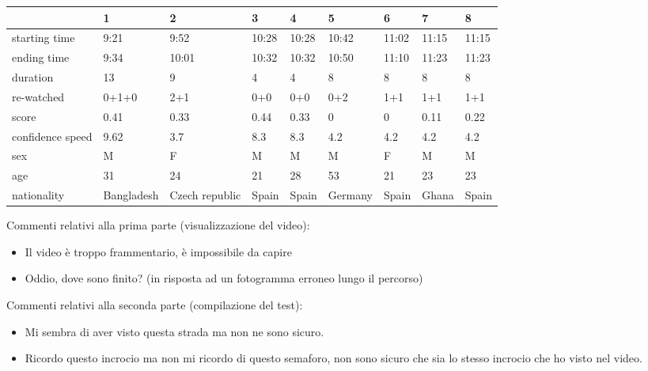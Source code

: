 \documentclass[12pt,a4paper,openright, notitlepage]{report}
\begin{document}
\begin{adjustwidth}{-1cm}{}
\small
\begin{center}
    \begin{tabular}{| l | l | p{2cm} | l | l | l | l | l | l |}
    \hline
	& 1 & 2 & 3 & 4 & 5 & 6 & 7 & 8 \\ \hline
	starting time & 9:21 & 9:52 & 10:28 & 10:28 & 10:42 & 11:02 & 11:15 & 11:15 \\ \hline
	ending time & 9:34 & 10:01 & 10:32 & 10:32 & 10:50 & 11:10 & 11:23 & 11:23 \\ \hline
	duration & 13 & 9 & 4 & 4 & 8 & 8 & 8 & 8 \\ \hline
	re-watched & 0+1+0 & 2+1 & 0+0 & 0+0 & 0+2 & 1+1 & 1+1 & 1+1 \\ \hline
	score & 0.41 & 0.33 & 0.44 & 0.33 & 0 & 0 & 0.11 & 0.22 \\ \hline
	confidence speed & 9.62 & 3.7 & 8.3 & 8.3 & 4.2 & 4.2 & 4.2 & 4.2 \\ \hline
	sex & M & F & M & M & M & F & M & M \\ \hline
	age & 31 & 24 & 21 & 28 & 53 & 21 & 23 & 23 \\ \hline
	nationality & Bangladesh & Czech republic & Spain & Spain & Germany & Spain & Ghana & Spain \\ \hline
    \end{tabular}
\end{center}
\normalsize
\end{adjustwidth}

Commenti relativi alla prima parte (visualizzazione del video):

\begin{itemize}
	\item Il video è troppo frammentario, è impossibile da capire
	\item Oddio, dove sono finito? (in risposta ad un fotogramma erroneo lungo il percorso)
\end{itemize}

Commenti relativi alla seconda parte (compilazione del test):

\begin{itemize}
	\item Mi sembra di aver visto questa strada ma non ne sono sicuro.
	\item Ricordo questo incrocio ma non mi ricordo di questo semaforo, non sono sicuro che sia lo stesso incrocio che ho visto nel video.
\end{itemize}



\nocite{*}

\end{document}
